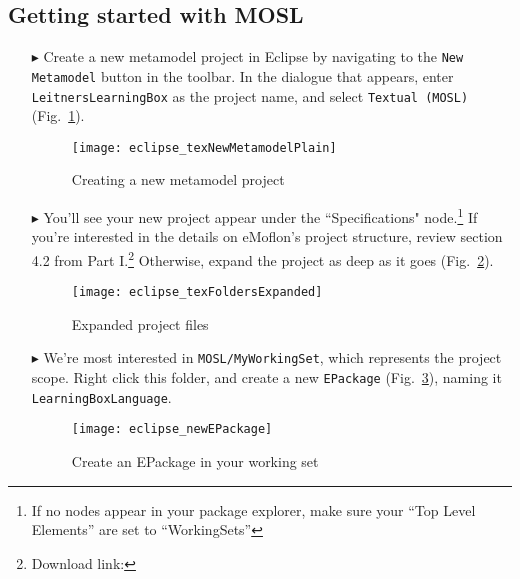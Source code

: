 \clearpage
\subsection{Getting started with MOSL}
\texHeader
\hypertarget{static tex}{} 

\begin{itemize}

\item[$\blacktriangleright$] Create a new metamodel project in Eclipse by navigating to the \texttt{New Metamodel} button in the toolbar. In the dialogue that
appears, enter \texttt{LeitnersLearningBox} as the project name, and select \texttt{Textual (MOSL)}  (Fig.~\ref{fig:new_project}).

\vspace{1cm}

\begin{figure}[htbp]
	\centering
  \texttt{[image: eclipse\_texNewMetamodelPlain]}
	\caption{Creating a new metamodel project}
	\label{fig:new_project}
\end{figure}

\vspace{1cm}

\item[$\blacktriangleright$] You'll see your new project appear under the ``Specifications" node.\footnote{If no nodes appear in your package explorer,
make sure your ``Top Level Elements'' are set to ``WorkingSets''} If you're interested in the details on eMoflon's project structure, review section
4.2 from Part I.\footnote{Download link: \dlPartOne} Otherwise, expand the project as deep as it goes (Fig.~\ref{fig:expanded_folders}).

\clearpage

\begin{figure}[htbp]
	\centering
  \texttt{[image: eclipse\_texFoldersExpanded]}
	\caption{Expanded project files}
	\label{fig:expanded_folders}
\end{figure} 

\item[$\blacktriangleright$] We're most interested in \texttt{MOSL/MyWorkingSet}, which represents the project scope. Right click this folder, and create a new
\texttt{EPackage} (Fig.~\ref{fig:new_EPackage}), naming it \texttt{LearningBoxLanguage}.

\vspace{0.5cm}

\begin{figure}[htbp]
	\centering
  \texttt{[image: eclipse\_newEPackage]}
	\caption{Create an EPackage in your working set}
	\label{fig:new_EPackage}
\end{figure} 


\end{itemize}
